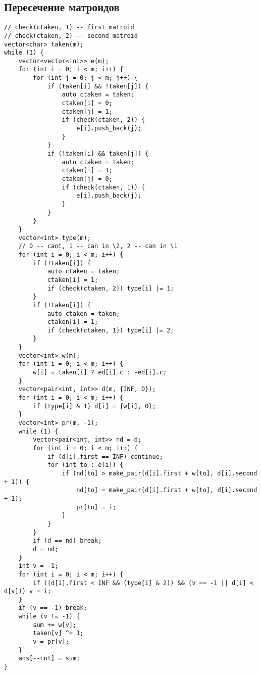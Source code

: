 \documentclass[14pt,fleqn]{article}
\begin{document}
\subsection{Пересечение матроидов}
\begin{Verbatim}[tabsize=4]
// check(ctaken, 1) -- first matroid
// check(ctaken, 2) -- second matroid
vector<char> taken(m);
while (1) {
	vector<vector<int>> e(m);
	for (int i = 0; i < m; i++) {
		for (int j = 0; j < m; j++) {
			if (taken[i] && !taken[j]) {
				auto ctaken = taken;
				ctaken[i] = 0;
				ctaken[j] = 1;
				if (check(ctaken, 2)) {
					e[i].push_back(j);
				}
			}
			if (!taken[i] && taken[j]) {
				auto ctaken = taken;
				ctaken[i] = 1;
				ctaken[j] = 0;
				if (check(ctaken, 1)) {
					e[i].push_back(j);
				}
			}
		}
	}
	vector<int> type(m);
	// 0 -- cant, 1 -- can in \2, 2 -- can in \1
	for (int i = 0; i < m; i++) {
		if (!taken[i]) {
			auto ctaken = taken;
			ctaken[i] = 1;
			if (check(ctaken, 2)) type[i] |= 1;
		}
		if (!taken[i]) {
			auto ctaken = taken;
			ctaken[i] = 1;
			if (check(ctaken, 1)) type[i] |= 2;
		}
	}
	vector<int> w(m);
	for (int i = 0; i < m; i++) {
		w[i] = taken[i] ? ed[i].c : -ed[i].c;
	}
	vector<pair<int, int>> d(m, {INF, 0});
	for (int i = 0; i < m; i++) {
		if (type[i] & 1) d[i] = {w[i], 0};
	}
	vector<int> pr(m, -1);
	while (1) {
		vector<pair<int, int>> nd = d;
		for (int i = 0; i < m; i++) {
			if (d[i].first == INF) continue;
			for (int to : e[i]) {
				if (nd[to] > make_pair(d[i].first + w[to], d[i].second + 1)) {
					nd[to] = make_pair(d[i].first + w[to], d[i].second + 1);
					pr[to] = i;
				}
			}
		}
		if (d == nd) break;
		d = nd;
	}
	int v = -1;
	for (int i = 0; i < m; i++) {
		if ((d[i].first < INF && (type[i] & 2)) && (v == -1 || d[i] < d[v])) v = i;
	}
	if (v == -1) break;
	while (v != -1) {
		sum += w[v];
		taken[v] ^= 1;
		v = pr[v];
	}
	ans[--cnt] = sum;
}
\end{Verbatim}
\end{document}
